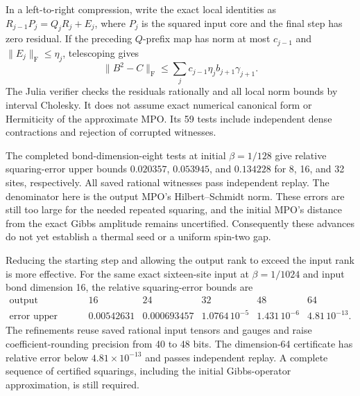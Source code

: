 \documentclass[11pt]{article}
\begin{document}
In a left-to-right compression, write the exact local identities as
$R_{j-1}P_j=Q_jR_j+E_j$, where $P_j$ is the squared input core and
the final step has zero residual. If the preceding $Q$-prefix map has
norm at most $c_{j-1}$ and $\|E_j\|_{\mathrm F}\le\eta_j$, telescoping
gives
\[
 \|B^2-C\|_{\mathrm F}
 \le \sum_j c_{j-1}\eta_j b_{j+1}\gamma_{j+1}.
\]
The Julia verifier checks the residuals rationally and all local norm
bounds by interval Cholesky. It does not assume exact numerical
canonical form or Hermiticity of the approximate MPO. Its 59 tests
include independent dense contractions and rejection of corrupted witnesses.

The completed bond-dimension-eight tests at initial $\beta=1/128$
give relative squaring-error upper bounds $0.020357$, $0.053945$, and
$0.134228$ for 8, 16, and 32 sites, respectively. All saved rational
witnesses pass independent replay. The denominator here is the output
MPO's Hilbert--Schmidt norm. These errors are still too large for the
needed repeated squaring, and the initial MPO's distance from the exact
Gibbs amplitude remains uncertified. Consequently these advances do
not yet establish a thermal seed or a uniform spin-two gap.

Reducing the starting step and allowing the output rank to exceed the
input rank is more effective. For the same exact sixteen-site input
at $\beta=1/1024$ and input bond dimension 16, the relative
squaring-error bounds are
\[
\begin{array}{c|ccccc}
\text{output dimension}&16&24&32&48&64\\\hline
\text{error upper bound}&0.00542631&0.000693457&1.0764\,10^{-5}&1.431\,10^{-6}&4.81\,10^{-13}.
\end{array}
\]
The refinements reuse saved rational input tensors and gauges and raise
coefficient-rounding precision from 40 to 48 bits. The dimension-64
certificate has relative error below $4.81\times10^{-13}$ and passes
independent replay. A complete
sequence of certified squarings, including the initial Gibbs-operator
approximation, is still required.
\end{document}
